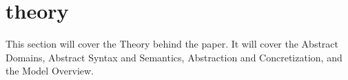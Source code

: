 \section{theory}\label{theory}
This section will cover the Theory behind the paper. It will cover the Abstract Domains, Abstract Syntax and Semantics, Abstraction and Concretization, and the Model Overview.



